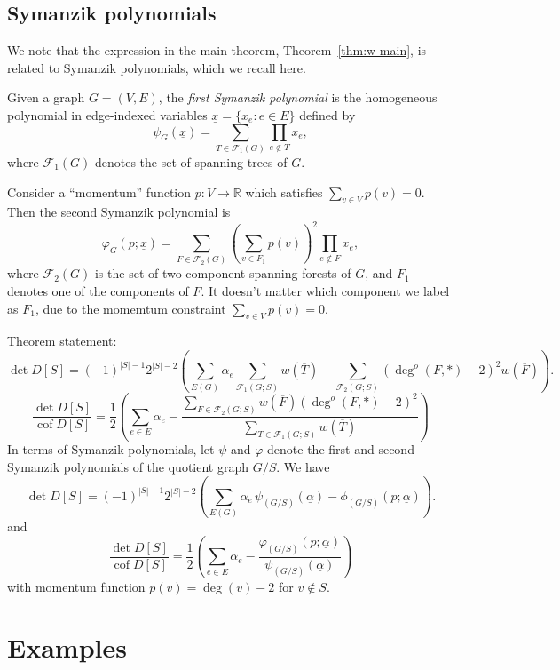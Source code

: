 \documentclass{amsart}
\theoremstyle{definition}
\newcommand{\RR}{\mathbb{R}}
\DeclareMathOperator{\cof}{cof}
\newcommand{\trees}{\mathcal{F}_1}
\newcommand{\forests}{\mathcal{F}}
\newcommand{\degout}{\deg^o}
\begin{document}
\subsection{Symanzik polynomials}

We note that the expression in the main theorem, Theorem~\ref{thm:w-main}, is related to Symanzik polynomials, which we recall here.

Given a graph $G = (V, E)$, the {\em first Symanzik polynomial} is the homogeneous polynomial in edge-indexed variables $\underline{x} = \{x_e : e \in E\}$ defined by
\[
	\psi_G(\underline{x}) = \sum_{T \in \trees(G)} \prod_{e \not \in T} x_e ,
\]
where $\trees(G)$ denotes the set of spanning trees of $G$.

Consider a ``momentum'' function $p: V \to \RR$ which satisfies $\sum_{v \in V} p(v) = 0$.
Then the second Symanzik polynomial is
\[
	\varphi_G(p; \underline{x}) = \sum_{F \in \forests_2(G)} \left(\sum_{v \in F_1} p(v) \right)^2 \prod_{e \not\in F} x_e ,
\]
where $\forests_2(G)$ is the set of two-component spanning forests of $G$, and $F_1$ denotes one of the components of $F$.
It doesn't matter which component we label as $F_1$, due to the momemtum constraint $\sum_{v \in V} p(v) = 0$.

Theorem statement:
\[
	\det D[S] = (-1)^{|S|-1} 2^{|S|-2} \left( \sum_{E(G)}\alpha_e \sum_{\trees(G;S)} w(\overline{T}) - \sum_{\forests_2(G;S)} (\degout(F,*) - 2)^2 w(\overline{F}) \right).
\]
\[
	\frac{\det D[S]}{\cof D[S]} = \frac12 \left( \sum_{e \in E} \alpha_e - \frac{\sum_{F \in \forests_2(G; S)} w(\overline{F}) (\degout(F,*) - 2)^2}{\sum_{T \in \trees(G; S)} w(\overline{T})} \right)
\]
In terms of Symanzik polynomials, let $\psi$ and $\varphi$ denote the first and second Symanzik polynomials of the quotient graph $G/S$.
We have
\[
	\det D[S] = (-1)^{|S|-1} 2^{|S|-2} \left( \sum_{E(G)}\alpha_e \, \psi_{(G/S)}(\underline{\alpha}) - \phi_{(G/S)}(p; \underline{\alpha}) \right).
\]
and
\[
	\frac{\det D[S]}{\cof D[S]} = \frac12 \left( \sum_{e \in E} \alpha_e - \frac{\varphi_{(G/S)}(p; \underline{\alpha})}{\psi_{(G/S)}(\underline{\alpha})} \right)
\]
with momentum function $p(v) = \deg(v) - 2$ for $v \not \in S$.


\section{Examples}
\end{document}
